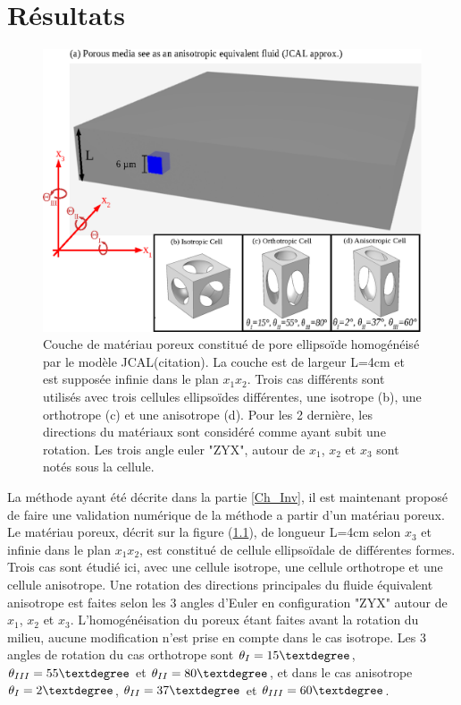 \documentclass[12pt]{report}
\begin{document}
\chapter{Résultats}
\label{Ch_Res}
  \begin{figure}[ht!]
        \centering
        \includegraphics{Material_2.eps}
        \caption{Couche de matériau poreux constitué de pore ellipsoïde homogénéisé par le modèle JCAL(citation). La couche est de largeur L=4cm et est supposée infinie dans le plan $x_1x_2$. Trois cas différents sont utilisés avec trois cellules ellipsoïdes différentes, une isotrope (b), une orthotrope (c) et une anisotrope (d). Pour les 2 dernière, les directions du matériaux sont considéré comme ayant subit une rotation. Les trois angle euler "ZYX", autour de $x_1$, $x_2$ et $x_3$ sont notés sous la cellule. }
        \label{Porous_Mat}
    \end{figure}

    La méthode ayant été décrite dans la partie \ref{Ch_Inv}, il est maintenant proposé de faire une validation numérique de la méthode a partir d'un matériau poreux. Le matériau poreux, décrit sur la figure (\ref{Porous_Mat}), de longueur L=4cm selon $x_3$ et infinie dans le plan $x_1x_2$, est constitué de cellule ellipsoïdale de différentes formes. Trois cas sont étudié ici, avec une cellule isotrope, une cellule orthotrope et une cellule anisotrope. Une rotation des directions principales du fluide équivalent anisotrope est faites selon les 3 angles d'Euler en configuration "ZYX" autour de $x_1$, $x_2$ et $x_3$. L'homogénéisation du poreux étant faites avant la rotation du milieu, aucune modification n'est prise en compte dans le cas isotrope. Les 3 angles de rotation du cas orthotrope sont $\theta_I=15\textdegree$, $\theta_{III}=55\textdegree$ et $\theta_{II}=80\textdegree$, et dans le cas anisotrope $\theta_I=2\textdegree$, $\theta_{II}=37\textdegree$ et $\theta_{III}=60\textdegree$.
    
\end{document}
